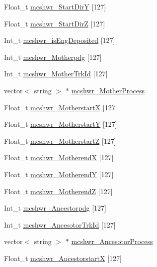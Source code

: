 \begin{DoxyCompactItemize}
\item 
Float\-\_\-t \hyperlink{classanatree_a2b5a9ee76bfbc9e0c744f7b29a548fc3}{mcshwr\-\_\-\-Start\-Dir\-Y} \mbox{[}127\mbox{]}
\item 
Float\-\_\-t \hyperlink{classanatree_a7300893b043799de2e91a746cd726b63}{mcshwr\-\_\-\-Start\-Dir\-Z} \mbox{[}127\mbox{]}
\item 
Int\-\_\-t \hyperlink{classanatree_abd5b38d2b902f99ac82d098b800873c3}{mcshwr\-\_\-is\-Eng\-Deposited} \mbox{[}127\mbox{]}
\item 
Int\-\_\-t \hyperlink{classanatree_a0228433dbbb714a5e221a5e8ce41a063}{mcshwr\-\_\-\-Motherpdg} \mbox{[}127\mbox{]}
\item 
Int\-\_\-t \hyperlink{classanatree_a41f7ebad0405c45177ff3e73cd3c5401}{mcshwr\-\_\-\-Mother\-Trk\-Id} \mbox{[}127\mbox{]}
\item 
vector$<$ string $>$ $\ast$ \hyperlink{classanatree_a8eca5519b33722cef863970e40a1826a}{mcshwr\-\_\-\-Mother\-Process}
\item 
Float\-\_\-t \hyperlink{classanatree_a714962598434731f1111efe1ce4a3f8a}{mcshwr\-\_\-\-Motherstart\-X} \mbox{[}127\mbox{]}
\item 
Float\-\_\-t \hyperlink{classanatree_ace73eae0e09f047dbf3f4f44c0298e80}{mcshwr\-\_\-\-Motherstart\-Y} \mbox{[}127\mbox{]}
\item 
Float\-\_\-t \hyperlink{classanatree_ae51faa4f0a405ba75308e91bfe2d14fe}{mcshwr\-\_\-\-Motherstart\-Z} \mbox{[}127\mbox{]}
\item 
Float\-\_\-t \hyperlink{classanatree_ace491baa07549f0d4a10d454e9dfb7ee}{mcshwr\-\_\-\-Motherend\-X} \mbox{[}127\mbox{]}
\item 
Float\-\_\-t \hyperlink{classanatree_ac234d407fff41dd80b1418c56233cde6}{mcshwr\-\_\-\-Motherend\-Y} \mbox{[}127\mbox{]}
\item 
Float\-\_\-t \hyperlink{classanatree_a4a46467f1301e3a84832ff04b59f8de8}{mcshwr\-\_\-\-Motherend\-Z} \mbox{[}127\mbox{]}
\item 
Int\-\_\-t \hyperlink{classanatree_aec33dd4aeeee76cfc44d6308719ccf67}{mcshwr\-\_\-\-Ancestorpdg} \mbox{[}127\mbox{]}
\item 
Int\-\_\-t \hyperlink{classanatree_a3f8b1a07c09a37638c033854a54a8e68}{mcshwr\-\_\-\-Ancesotor\-Trk\-Id} \mbox{[}127\mbox{]}
\item 
vector$<$ string $>$ $\ast$ \hyperlink{classanatree_aa5d90860444fade2049cb26233e1c2d0}{mcshwr\-\_\-\-Ancesotor\-Process}
\item 
Float\-\_\-t \hyperlink{classanatree_a85f3b3fcbef0beb67bbaf412f4db31f5}{mcshwr\-\_\-\-Ancestorstart\-X} \mbox{[}127\mbox{]}

\end{DoxyCompactItemize}
